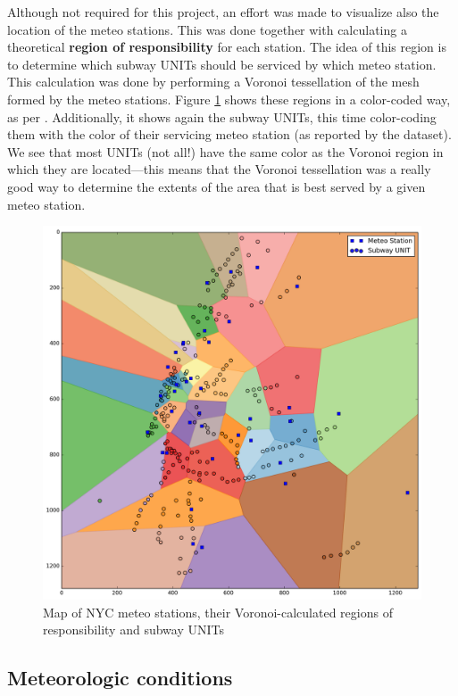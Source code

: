 \documentclass{article}
\begin{document}
Although not required for this project, an effort was made to visualize also the location of the meteo stations. This was done together with calculating a theoretical \textbf{region of responsibility} for each station. The idea of this region is to determine which subway UNITs should be serviced by which meteo station. This calculation was done by performing a Voronoi tessellation of the mesh formed by the meteo stations. Figure \ref{fig:meteo_voronoi} shows these regions in a color-coded way, as per \cite{so_color_voronoi}. Additionally, it shows again the subway UNITs, this time color-coding them with the color of their servicing meteo station (as reported by the dataset). We see that most UNITs (not all!) have the same color as the Voronoi region in which they are located---this means that the Voronoi tessellation was a really good way to determine the extents of the area that is best served by a given meteo station. 

\begin{figure}[ht]
\centering
\includegraphics[scale=0.6]{meteo_voronoi.png}
\caption{Map of NYC meteo stations, their Voronoi-calculated regions of responsibility and subway UNITs}
\label{fig:meteo_voronoi}
\end{figure}

\subsection{Meteorologic conditions}
\end{document}
